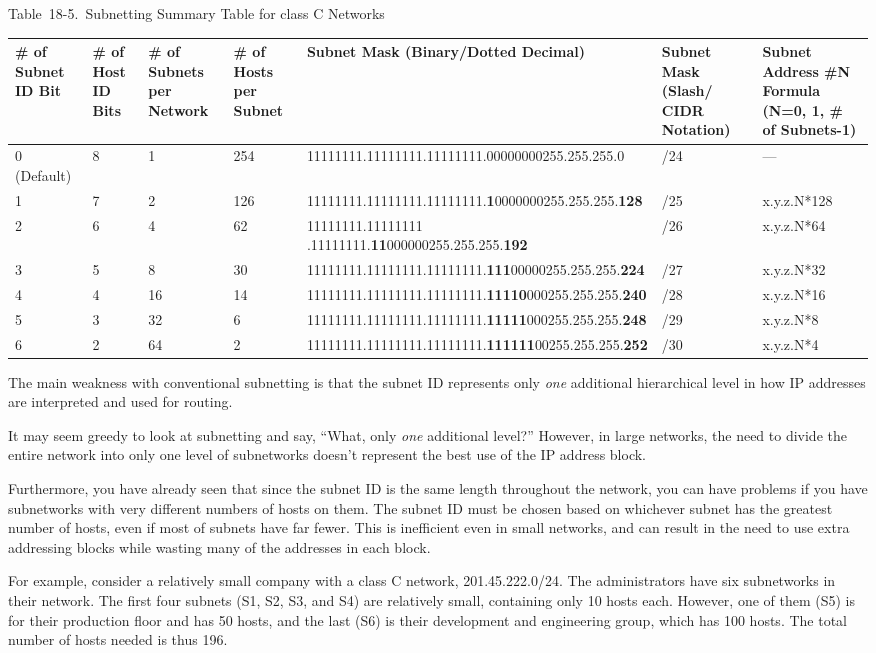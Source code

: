 Table~18-5.~Subnetting Summary Table for class C Networks

\begin{longtable}[]{@{}lllllll@{}}
\toprule
\# of Subnet ID Bit & \# of Host ID Bits & \# of Subnets per Network &
\# of Hosts per Subnet & Subnet Mask (Binary/Dotted Decimal) & Subnet
Mask (Slash/ CIDR Notation) & Subnet Address \#N Formula (N=0, 1, \# of
Subnets-1)\tabularnewline
\midrule
\endhead
0 (Default) & 8 & 1 & 254 &
11111111.11111111.11111111.00000000255.255.255.0 & /24 &
---\tabularnewline
1 & 7 & 2 & 126 &
11111111.11111111.11111111.{\textbf{1}}0000000255.255.255.{\textbf{128}}
& /25 & x.y.z.N*128\tabularnewline
2 & 6 & 4 & 62 & 11111111.11111111
.11111111.{\textbf{11}}000000255.255.255.{\textbf{192}} & /26 &
x.y.z.N*64\tabularnewline
3 & 5 & 8 & 30 &
11111111.11111111.11111111.{\textbf{111}}00000255.255.255.{\textbf{224}}
& /27 & x.y.z.N*32\tabularnewline
4 & 4 & 16 & 14 &
11111111.11111111.11111111.{\textbf{11110}}000255.255.255.{\textbf{240}}
& /28 & x.y.z.N*16\tabularnewline
5 & 3 & 32 & 6 &
11111111.11111111.11111111.{\textbf{11111}}000255.255.255.{\textbf{248}}
& /29 & x.y.z.N*8\tabularnewline
6 & 2 & 64 & 2 &
11111111.11111111.11111111.{\textbf{111111}}00255.255.255.{\textbf{252}}
& /30 & x.y.z.N*4\tabularnewline
\bottomrule
\end{longtable}



The main
weakness with conventional subnetting is that the subnet ID represents
only {\emph{one}} additional hierarchical level in how IP addresses are
interpreted and used for routing.

It may seem greedy to look at subnetting and say, ``What, only
{\emph{one}} additional level?'' However, in large networks, the need to
divide the entire network into only one level of subnetworks doesn't
represent the best use of the IP address block.

Furthermore, you have already seen that since the subnet ID is the same
length throughout the network, you can have problems if you have
subnetworks with very different numbers of hosts on them. The subnet ID
must be chosen based on whichever subnet has the greatest number of
hosts, even if most of subnets have far fewer. This is inefficient even
in small networks, and can result in the need to use extra addressing
blocks while wasting many of the addresses in each block.

For example, consider a relatively small company with a class C network,
201.45.222.0/24. The administrators have six subnetworks in their
network. The first four subnets (S1, S2, S3, and S4) are relatively
small, containing only 10 hosts each. However, one of them (S5) is for
their production floor and has 50 hosts, and the last (S6) is their
development and engineering group, which has 100 hosts. The total number
of hosts needed is thus 196.

